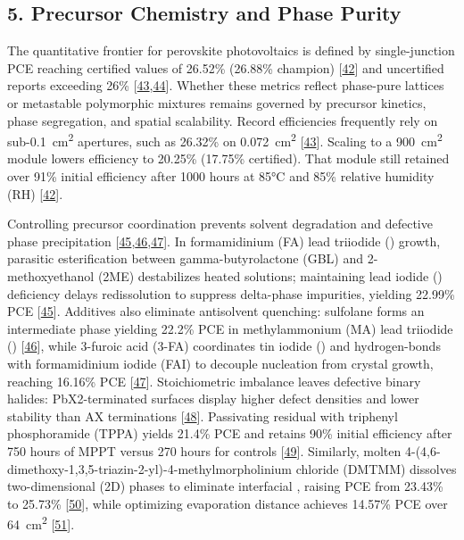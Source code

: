\documentclass[
  11pt,
]{article}
\begin{document}
\subsection{5. Precursor Chemistry and Phase
Purity}\label{precursor-chemistry-and-phase-purity}

The quantitative frontier for perovskite photovoltaics is defined by
single-junction PCE reaching certified values of 26.52\% (26.88\%
champion) {[}\href{https://doi.org/10.1126/sciadv.aed6327}{42}{]} and
uncertified reports exceeding 26\%
{[}\href{https://doi.org/10.1002/advs.76508}{43},\href{https://doi.org/10.26434/chemrxiv.15006632/v1}{44}{]}.
Whether these metrics reflect phase-pure lattices or metastable
polymorphic mixtures remains governed by precursor kinetics, phase
segregation, and spatial scalability. Record efficiencies frequently
rely on sub-\qty{0.1}{\centi\meter\squared} apertures, such as 26.32\%
on \qty{0.072}{\centi\meter\squared}
{[}\href{https://doi.org/10.1002/advs.76508}{43}{]}. Scaling to a
\qty{900}{\centi\meter\squared} module lowers efficiency to 20.25\%
(17.75\% certified). That module still retained over 91\% initial
efficiency after 1000 hours at 85°C and 85\% relative humidity (RH)
{[}\href{https://doi.org/10.1126/sciadv.aed6327}{42}{]}.

Controlling precursor coordination prevents solvent degradation and
defective phase precipitation
{[}\href{https://doi.org/10.1021/jacs.6c05502}{45},\href{https://doi.org/10.1021/acsaem.6c01764}{46},\href{https://doi.org/10.1002/adfm.76731}{47}{]}.
In formamidinium (FA) lead triiodide () growth, parasitic
esterification between gamma-butyrolactone (GBL) and 2-methoxyethanol
(2ME) destabilizes heated solutions; maintaining lead iodide ()
deficiency delays redissolution to suppress delta-phase impurities,
yielding 22.99\% PCE
{[}\href{https://doi.org/10.1021/jacs.6c05502}{45}{]}. Additives also
eliminate antisolvent quenching: sulfolane forms an intermediate phase
yielding 22.2\% PCE in methylammonium (MA) lead triiodide ()
{[}\href{https://doi.org/10.1021/acsaem.6c01764}{46}{]}, while 3-furoic
acid (3-FA) coordinates tin iodide () and hydrogen-bonds with
formamidinium iodide (FAI) to decouple nucleation from crystal growth,
reaching 16.16\% PCE
{[}\href{https://doi.org/10.1002/adfm.76731}{47}{]}. Stoichiometric
imbalance leaves defective binary halides: PbX2-terminated surfaces
display higher defect densities and lower stability than AX terminations
{[}\href{https://doi.org/10.1021/acsnano.6c08922}{48}{]}. Passivating
residual  with triphenyl phosphoramide (TPPA) yields 21.4\% PCE
and retains 90\% initial efficiency after 750 hours of MPPT versus 270
hours for controls
{[}\href{https://doi.org/10.1021/acsaem.6c01370}{49}{]}. Similarly,
molten 4-(4,6-dimethoxy-1,3,5-triazin-2-yl)-4-methylmorpholinium
chloride (DMTMM) dissolves two-dimensional (2D) phases to eliminate
interfacial , raising PCE from 23.43\% to 25.73\%
{[}\href{https://doi.org/10.1002/adfm.76974}{50}{]}, while optimizing
 evaporation distance achieves 14.57\% PCE over
\qty{64}{\centi\meter\squared}
{[}\href{https://doi.org/10.1002/solr.70430}{51}{]}.
\end{document}
